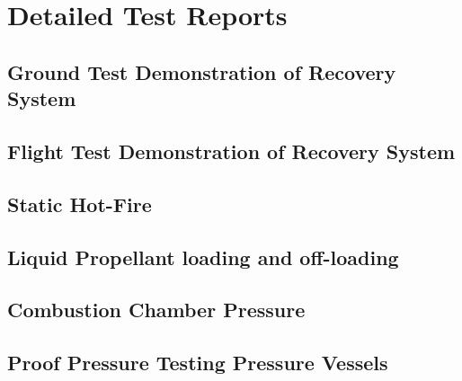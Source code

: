 \section{Detailed Test Reports}

\subsection{Ground Test Demonstration of Recovery System}



\newpage

\subsection{Flight Test Demonstration of Recovery System}



\subsection{Static Hot-Fire}







\subsection{Liquid Propellant loading and off-loading}



\subsection{Combustion Chamber Pressure}



\newpage

\subsection{Proof Pressure Testing Pressure Vessels}\label{sec:app_proof_pressure_testing}

